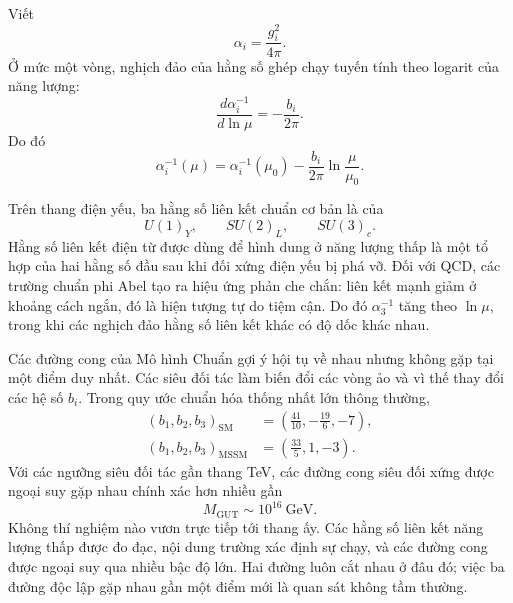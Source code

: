 Viết
\begin{equation}
\alpha_i=\frac{g_i^2}{4\pi}.
\end{equation}
Ở mức một vòng, nghịch đảo của hằng số ghép chạy tuyến tính theo logarit của năng lượng:
\begin{equation}
\frac{d\alpha_i^{-1}}{d\ln\mu}
=-\frac{b_i}{2\pi}.
\end{equation}
Do đó
\begin{equation}
\alpha_i^{-1}(\mu)
=\alpha_i^{-1}(\mu_0)
-\frac{b_i}{2\pi}\ln\frac{\mu}{\mu_0}.
\end{equation}

Trên thang điện yếu, ba hằng số liên kết chuẩn cơ bản là của
\begin{equation}
U(1)_Y,\qquad SU(2)_L,\qquad SU(3)_c.
\end{equation}
Hằng số liên kết điện từ được dùng để hình dung ở năng lượng thấp là một tổ hợp của hai hằng số đầu sau khi đối xứng điện yếu bị phá vỡ. Đối với QCD, các trường chuẩn phi Abel tạo ra hiệu ứng phản che chắn: liên kết mạnh giảm ở khoảng cách ngắn, đó là hiện tượng tự do tiệm cận. Do đó \(\alpha_3^{-1}\) tăng theo \(\ln\mu\), trong khi các nghịch đảo hằng số liên kết khác có độ dốc khác nhau.

Các đường cong của Mô hình Chuẩn gợi ý hội tụ về nhau nhưng không gặp tại một điểm duy nhất. Các siêu đối tác làm biến đổi các vòng ảo và vì thế thay đổi các hệ số \(b_i\). Trong quy ước chuẩn hóa thống nhất lớn thông thường,
\begin{align}
(b_1,b_2,b_3)_{\mathrm{SM}}
&=\left(\frac{41}{10},-\frac{19}{6},-7\right),\\
(b_1,b_2,b_3)_{\mathrm{MSSM}}
&=\left(\frac{33}{5},1,-3\right).
\end{align}
Với các ngưỡng siêu đối tác gần thang TeV, các đường cong siêu đối xứng được ngoại suy gặp nhau chính xác hơn nhiều gần
\begin{equation}
M_{\mathrm{GUT}}\sim 10^{16}\ \mathrm{GeV}.
\end{equation}
Không thí nghiệm nào vươn trực tiếp tới thang ấy. Các hằng số liên kết năng lượng thấp được đo đạc, nội dung trường xác định sự chạy, và các đường cong được ngoại suy qua nhiều bậc độ lớn. Hai đường luôn cắt nhau ở đâu đó; việc ba đường độc lập gặp nhau gần một điểm mới là quan sát không tầm thường.

